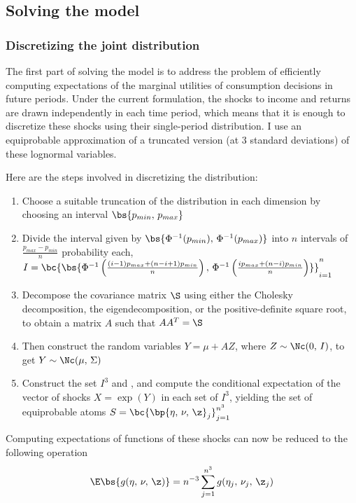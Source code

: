 \subsection{Solving the model}

\subsubsection{Discretizing the joint distribution}

The first part of solving the model is to address the problem of efficiently computing expectations of the marginal utilities of consumption decisions in future periods. Under the current formulation, the shocks to income and returns are drawn independently in each time period, which means that it is enough to discretize these shocks using their single-period distribution. I use an equiprobable approximation of a truncated version (at 3 standard deviations) of these lognormal variables.

Here are the steps involved in discretizing the distribution:
\begin{enumerate}
    \item Choose a suitable truncation of the distribution in each dimension by choosing an interval $\bs{p_{min},\,p_{max}}$
    \item Divide the interval given by $\bs{\Phi^{-1}(p_{min}),\,\Phi^{-1}(p_{max})}$ into $n$ intervals of $\frac{p_{max} - p_{min}}{n}$ probability each, $I = \bc{\bs{\Phi^{-1}\left(\frac{(i - 1)p_{max} + (n - i + 1)p_{min}}{n}\right),\,\Phi^{-1}\left(\frac{ip_{max} + (n - i)p_{min}}{n}\right)}}_{i=1}^{n}$
    \item Decompose the covariance matrix $\S$ using either the Cholesky decomposition, the eigendecomposition, or the positive-definite square root, to obtain a matrix $A$ such that $AA^T = \S$
    \item Then construct the random variables $Y = \mu + AZ$, where $Z \sim \Nc(0,\,I)$, to get $Y \sim \Nc(\mu,\,\Sigma)$
    \item Construct the set $I^3$ and , and compute the conditional expectation of the vector of shocks $X = \exp(Y)$ in each set of $I^3$, yielding the set of equiprobable atoms $S = \bc{\bp{\eta,\,\nu,\,\z}_{j}}_{j=1}^{n^3}$
\end{enumerate}

Computing expectations of functions of these shocks can now be reduced to the following operation
\[
\E\bs{g(\eta,\,\nu,\,\z)} = n^{-3}\sum_{j=1}^{n^3}g(\eta_j,\,\nu_j,\,\z_j)
\]

